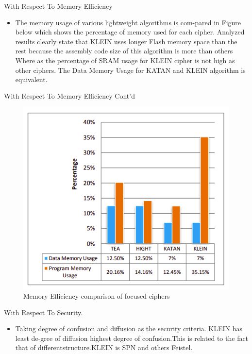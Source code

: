 \begin{frame}{With Respect To Memory Efficiency}
	\begin{itemize}
		\item The memory usage of various lightweight algorithms is com-pared in Figure below which shows the percentage of memory used for each cipher. Analyzed results clearly state that KLEIN uses longer Flash memory space than the rest because the assembly code size of this algorithm is more than others Where as the percentage of SRAM usage for KLEIN cipher is not high as other ciphers. The Data Memory Usage for KATAN and KLEIN algorithm is equivalent.
	\end{itemize}
\end{frame}

\begin{frame}{With Respect To Memory Efficiency Cont'd}
	\begin{itemize}
    \begin{figure}
    \centering
    \includegraphics[width= 75 mm]{images/DM.png} 
    \caption{Memory Efficiency comparison of focused ciphers}
    \label{fig:6distinguisher}
\end{figure} 
	\end{itemize}
\end{frame}

\begin{frame}{With Respect To Security.}
	\begin{itemize}
		\item Taking degree of confusion and diffusion as the security criteria. KLEIN has least de-gree of diffusion highest degree of confusion.This is related to the fact that of differentstructure.KLEIN is SPN and others Feistel.
	\end{itemize}
\end{frame}

